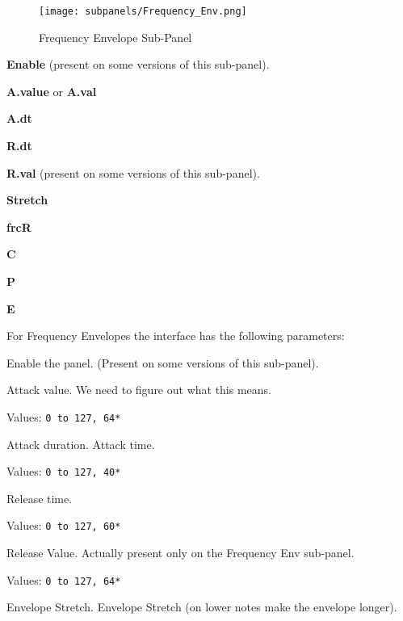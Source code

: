 \begin{figure}[H]
   \centering
   \texttt{[image: subpanels/Frequency\_Env.png]}
   \caption[Frequency Envelope Sub-Panel]{Frequency Envelope Sub-Panel}
   \label{fig:frequency_env}
\end{figure}

   \begin{enumber}
      \item \textbf{Enable} (present on some versions of this sub-panel).
      \item \textbf{A.value} or \textbf{A.val}
      \item \textbf{A.dt}
      \item \textbf{R.dt}
      \item \textbf{R.val} (present on some versions of this sub-panel).
      \item \textbf{Stretch}
      \item \textbf{frcR}
      \item \textbf{C}
      \item \textbf{P}
      \item \textbf{E}
   \end{enumber}

   For Frequency Envelopes the interface has the following parameters:

   \setcounter{ItemCounter}{0}      %

   Enable the panel.  (Present on some versions of this sub-panel).

   Attack value.
   We need to figure out what this means.

   Values: \texttt{0 to 127, 64*}

   Attack duration. Attack time.

   Values: \texttt{0 to 127, 40*}

   Release time.

   Values: \texttt{0 to 127, 60*}

   Release Value.
   Actually present only on the Frequency Env sub-panel.

   Values: \texttt{0 to 127, 64*}

   Envelope Stretch.
   Envelope Stretch (on lower notes make the envelope longer).

